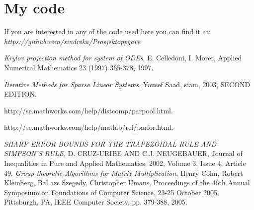\chapter*{My code}%

If you are interested in any of the code used here you can find it at: \\
\emph{https://github.com/sindreka/Prosjektoppgave}




\begin{thebibliography}{9}
		\emph{Krylov projection method for system of ODEs},
		E. Celledoni, I. Moret,
		Applied Numerical Mathematics 23 (1997) 365-378,
		1997.
		
		\emph{Iterative Methods for Sparse Linear Systems},
		Yousef Saad,
		siam,
		2003,
		SECOND EDITION.

  		http://se.mathworks.com/help/distcomp/parpool.html.
  
  		http://se.mathworks.com/help/matlab/ref/parfor.html.
  
		\emph{SHARP ERROR BOUNDS FOR THE TRAPEZOIDAL RULE AND SIMPSON’S RULE},
		D. CRUZ-URIBE AND C.J. NEUGEBAUER,
		Journal of Inequalities in Pure and Applied Mathematics,
		2002,
		Volume 3, Issue 4, Article 49.
		\emph{Group-theoretic Algorithms for Matrix Multiplication},
		Henry Cohn, Robert Kleinberg, Bal azs Szegedy, Christopher Umans,
		Proceedings of the 46th Annual Symposium on Foundations of Computer Science, 23-25 October 2005, Pittsburgh, PA, IEEE Computer Society, pp. 379-388,
		2005.
\end{thebibliography}

